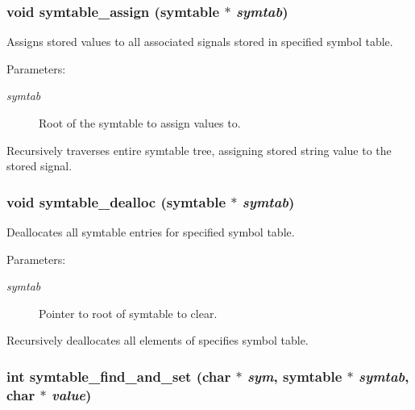 \subsubsection{\setlength{\rightskip}{0pt plus 5cm}void symtable\_\-assign ({\bf symtable} $\ast$ {\em symtab})}\label{symtable_8h_a3}


Assigns stored values to all associated signals stored in specified symbol table.

\begin{Desc}
\item[Parameters: ]\par
\begin{description}
\item[{\em 
symtab}]Root of the symtable to assign values to.\end{description}
\end{Desc}
Recursively traverses entire symtable tree, assigning stored string value to the stored signal. 
\subsubsection{\setlength{\rightskip}{0pt plus 5cm}void symtable\_\-dealloc ({\bf symtable} $\ast$ {\em symtab})}\label{symtable_8h_a4}


Deallocates all symtable entries for specified symbol table.

\begin{Desc}
\item[Parameters: ]\par
\begin{description}
\item[{\em 
symtab}]Pointer to root of symtable to clear.\end{description}
\end{Desc}
Recursively deallocates all elements of specifies symbol table. 
\subsubsection{\setlength{\rightskip}{0pt plus 5cm}int symtable\_\-find\_\-and\_\-set (char $\ast$ {\em sym}, {\bf symtable} $\ast$ {\em symtab}, char $\ast$ {\em value})}\label{symtable_8h_a1}


